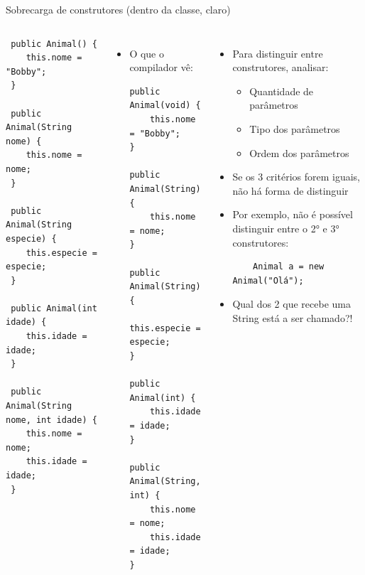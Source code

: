 \documentclass[portuguese, aspectratio=169, xcolor=table]{beamer}
\begin{document}
\begin{frame}[fragile]{Sobrecarga de construtores (dentro da classe, claro)}
\begin{columns}
\scriptsize
\begin{verbatim}
 public Animal() {
    this.nome = "Bobby";
 }

 public Animal(String nome) {
    this.nome = nome;
 }

 public Animal(String especie) {
    this.especie = especie;
 }

 public Animal(int idade) {
    this.idade = idade;
 }

 public Animal(String nome, int idade) {
    this.nome = nome;
    this.idade = idade;
 }
\end{verbatim}

\scriptsize
\begin{itemize}
\item O que o compilador vê:
\begin{verbatim}
public Animal(void) {
    this.nome = "Bobby";
}

public Animal(String) {
    this.nome = nome;
}

public Animal(String) {
    this.especie = especie;
}

public Animal(int) {
    this.idade = idade;
}

public Animal(String, int) {
    this.nome = nome;
    this.idade = idade;
}
\end{verbatim}
\end{itemize}

\scriptsize
\begin{itemize}
\item Para distinguir entre construtores, analisar:
\begin{itemize}
    \scriptsize
    \item Quantidade de parâmetros
    \item Tipo dos parâmetros
    \item Ordem dos parâmetros
\end{itemize}
\item Se os 3 critérios forem iguais, não há forma de distinguir
\item Por exemplo, não é possível distinguir entre o 2° e 3° construtores:
\begin{verbatim}
    Animal a = new Animal("Olá");
\end{verbatim}
\item Qual dos 2 que recebe uma String está a ser chamado?!
\end{itemize}
\end{columns}
\end{frame}
\end{document}
